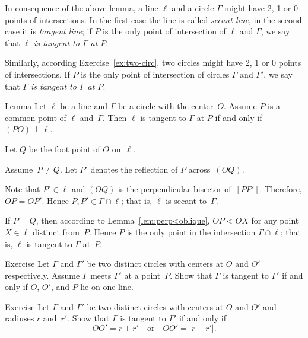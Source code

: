In consequence of the above lemma, 
a line $\ell$ and a circle $\Gamma$ might have 2, 1 or 0 points of intersections.
In the first case the line is called \emph{secant line}, in the second case it is \emph{tangent line};
if $P$ is the only point of intersection of $\ell$ and $\Gamma$,
we say that {}\emph{$\ell$ is tangent to $\Gamma$ at $P$}. 

Similarly, according Exercise~\ref{ex:two-circ},
two circles might have 2, 1 or 0 points of intersections.
If $P$ is the only point of intersection of circles $\Gamma$ and $\Gamma'$,
we say that \emph{$\Gamma$ is tangent to $\Gamma$ at $P$}. 

\begin{thm}[\abs]{Lemma}\label{lem:tangent}
Let $\ell$ be a line and $\Gamma$ be a circle with the center~$O$.
Assume $P$ is a common point of $\ell$ and~$\Gamma$. 
Then $\ell$ is tangent to $\Gamma$ at $P$ if and only if $(PO)\perp \ell$.
\end{thm}

Let $Q$ be the foot point of $O$ on~$\ell$.

Assume~$P\ne Q$.
Let $P'$ denotes the reflection of $P$ across~$(OQ)$.

Note that $P'\in\ell$ and $(OQ)$ is the perpendicular bisector of~$[PP']$.
Therefore, $OP=OP'$.
Hence $P,P'\in \Gamma\cap \ell$;
that is, $\ell$ is secant to~$\Gamma$.

If $P=Q$, 
then according to Lemma~\ref{lem:perp<oblique},
$OP<OX$ for any point $X\in \ell$ distinct from~$P$.
Hence $P$ is the only point in the intersection $\Gamma\cap\ell$;
that is, $\ell$ is tangent to $\Gamma$ at~$P$. 
\qeds

\begin{thm}{Exercise}\label{ex:tangent-circles}
Let $\Gamma$ and $\Gamma'$ be two distinct circles with centers at $O$ and $O'$ respectively. 
Assume $\Gamma$ meets $\Gamma'$ at a point~$P$.
Show that $\Gamma$ is tangent to $\Gamma'$ if and only if $O$, $O'$, and $P$ lie on one line.
\end{thm}

\begin{thm}{Exercise}\label{ex:tangent-circles-2}
Let $\Gamma$ and $\Gamma'$ be two distinct circles with centers at $O$ and $O'$ and radiuses $r$ and~$r'$.
Show that $\Gamma$ is tangent to $\Gamma'$ if and only if
$$OO'=r+r'
\quad
\text{or}\quad
OO'=|r-r'|.$$

\end{thm}

